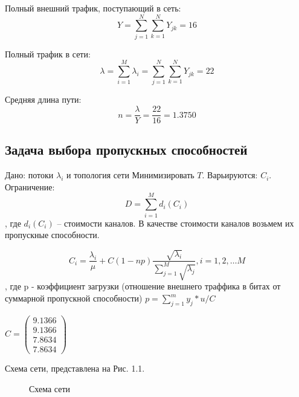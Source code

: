 \documentclass[14pt,a4paper,report]{report}
\begin{document}
Полный внешний трафик, поступающий в сеть:
$$ Y = \sum_{j=1}^N  \sum_{k=1}^N Y_{jk} =16 $$

Полный трафик в сети:
$$ \lambda = \sum_{i=1}^M \lambda_i = \sum_{j=1}^N  \sum_{k=1}^N Y_{jk} = 22 $$

Средняя длина пути:
$$ n = \frac{\lambda}{Y} =\frac{22}{16} = 1.3750
  $$




\subsection{Задача выбора пропускных способностей}


Дано: потоки ${\lambda_i}$ и топология сети
Минимизировать $T$.
Варьируются: ${C_i}$.
Ограничение:
$$ D= \sum_{i=1}^M d_i (C_i)$$
, где $d_i(C_i)$ – стоимости каналов. В качестве стоимости каналов возьмем их пропускные способности.

$$ C_i = \frac{\lambda_i}{\mu} + C(1-n p) \frac{\sqrt{\lambda_i}}{ \sum_{j=1}^M \sqrt{\lambda_j}},  i=1,2,… M$$ 
, где p - коэффициент загрузки (отношение внешнего траффика в битах от суммарной пропускной способности)
 $p = \sum_{j=1}^m y_j*u/C$


$C = \begin{pmatrix} 
9.1366 \\
9.1366 \\
7.8634 \\
7.8634 
\end{pmatrix}
\quad$



Схема сети, представлена на Рис. 1.1.

\begin{figure}[h!]
\caption{Схема сети}
\label{ris:image}
\end{figure}
\end{document}
